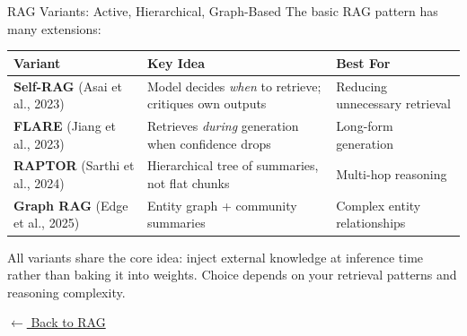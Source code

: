\documentclass[aspectratio=169]{beamer}
\begin{document}
\begin{frame}{RAG Variants: Active, Hierarchical, Graph-Based}
  \hypertarget{rag-variants}{}
  \small
  The basic RAG pattern has many extensions:

  \vspace{6pt}
  \begin{center}
  \footnotesize
  \begin{tabular}{p{2.2cm}p{4.0cm}p{4.0cm}}
    \toprule
    \textbf{Variant} & \textbf{Key Idea} & \textbf{Best For} \\
    \midrule
    \textbf{Self-RAG} \newline\scriptsize(Asai et al., 2023) & Model decides \emph{when} to retrieve; critiques own outputs & Reducing unnecessary retrieval \\
    \textbf{FLARE} \newline\scriptsize(Jiang et al., 2023) & Retrieves \emph{during} generation when confidence drops & Long-form generation \\
    \textbf{RAPTOR} \newline\scriptsize(Sarthi et al., 2024) & Hierarchical tree of summaries, not flat chunks & Multi-hop reasoning \\
    \textbf{Graph RAG} \newline\scriptsize(Edge et al., 2025) & Entity graph + community summaries & Complex entity relationships \\
    \bottomrule
  \end{tabular}
  \end{center}

  \vspace{6pt}
  {\footnotesize\color{NoteGray} All variants share the core idea: inject external knowledge at inference time rather than baking it into weights. Choice depends on your retrieval patterns and reasoning complexity.}

  \vspace{6pt}
  {\footnotesize\color{AtlasCool} \hyperlink{rag-main}{$\leftarrow$ Back to RAG}}
\end{frame}
\end{document}
